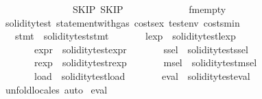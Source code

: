 \begin{isabellebody}
\ \ \ \ \ \ \ \ \ \ \ \ \ {\isacharparenleft}{\kern0pt}{\isacharbrackleft}{\kern0pt}{\isacharbrackright}{\kern0pt}{\isacharcomma}{\kern0pt}\ {\isacharparenleft}{\kern0pt}{\isacharbrackleft}{\kern0pt}{\isacharbrackright}{\kern0pt}{\isacharcomma}{\kern0pt}\ SKIP{\isacharparenright}{\kern0pt}{\isacharcomma}{\kern0pt}\ SKIP{\isacharparenright}{\kern0pt}\isanewline
\ \ \ \ \ \ \ \ \ \ \ \ \ fmempty{\isachardoublequoteclose}\isanewline
\isanewline
{}\isamarkupfalse%
\ soliditytest{}{\isacharcolon}{\kern0pt}\ statement{\isacharunderscore}{\kern0pt}with{\isacharunderscore}{\kern0pt}gas\ costs{\isacharunderscore}{\kern0pt}ex\ testenv{}\ costs{\isacharunderscore}{\kern0pt}min\isanewline
\ \ \ stmt{}\ {\isacharequal}{\kern0pt}\ {\isachardoublequoteopen}soliditytest{}{\isachardot}{\kern0pt}stmt{\isachardoublequoteclose}\isanewline
\ \ \ \ \ \ \ lexp{}\ {\isacharequal}{\kern0pt}\ soliditytest{}{\isachardot}{\kern0pt}lexp\ \isanewline
\ \ \ \ \ \ \ expr{}\ {\isacharequal}{\kern0pt}\ soliditytest{}{\isachardot}{\kern0pt}expr\isanewline
\ \ \ \ \ \ \ ssel{}\ {\isacharequal}{\kern0pt}\ soliditytest{}{\isachardot}{\kern0pt}ssel\isanewline
\ \ \ \ \ \ \ rexp{}\ {\isacharequal}{\kern0pt}\ soliditytest{}{\isachardot}{\kern0pt}rexp\isanewline
\ \ \ \ \ \ \ msel{}\ {\isacharequal}{\kern0pt}\ soliditytest{}{\isachardot}{\kern0pt}msel\isanewline
\ \ \ \ \ \ \ load{}\ {\isacharequal}{\kern0pt}\ soliditytest{}{\isachardot}{\kern0pt}load\isanewline
\ \ \ \ \ \ \ eval{}\ {\isacharequal}{\kern0pt}\ soliditytest{}{\isachardot}{\kern0pt}eval\isanewline
%
\isadelimproof
\ \ %
\endisadelimproof
%
\isatagproof
{}\isamarkupfalse%
\ unfold{\isacharunderscore}{\kern0pt}locales\ auto%
\endisatagproof
{\isafoldproof}%
%
\isadelimproof
\isanewline
%
\endisadelimproof
\isanewline
{}\isamarkupfalse%
\ {\isachardoublequoteopen}eval{}\ {}{}{}{}\isanewline

\end{isabellebody}
